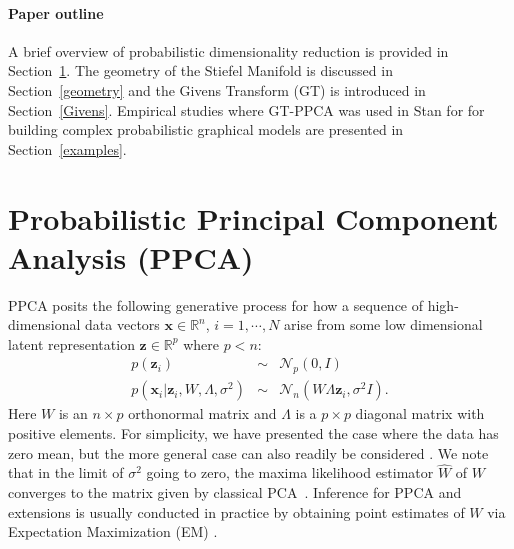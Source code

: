 \documentclass{article}
\newcommand{\mb}[1]{\mathbf{#1}}
\begin{document}
\paragraph{Paper outline} A brief overview of probabilistic dimensionality reduction is provided in Section~\ref{Probabilistic dimensionality reduction}. The geometry of the Stiefel Manifold is discussed in Section~\ref{geometry} and the Givens Transform (GT) is introduced in Section~\ref{Givens}. Empirical studies where GT-PPCA was used in Stan for for building complex probabilistic graphical models are presented in Section~\ref{examples}.


\section{Probabilistic Principal Component Analysis (PPCA)} \label{Probabilistic dimensionality reduction}

PPCA posits the following generative process for how a sequence of high-dimensional data vectors $\mathbf{x} \in \mathbb{R}^n$, $i = 1, \cdots, N$ arise from some low dimensional latent representation $\mathbf{z} \in \mathbb{R}^p$ where $p < n$:
\begin{eqnarray}
\label{eq:PpcaGenerativeProcess}
p(\mb{z}_i) &\sim& \mathcal{N}_p(0, I) \nonumber\\
p(\mb{x}_i | \mb{z}_i, W, \Lambda, \sigma^2) &\sim& \mathcal{N}_n(W \Lambda \mb{z}_i, \sigma^2 I).
\end{eqnarray}
Here $W$ is an $n \times p$ orthonormal matrix and $\Lambda$ is a $p \times p$ diagonal matrix with positive elements.  For simplicity, we have presented the case where the data has zero mean, but the more general case can also readily be considered \citep[chapt.~12.1]{murphy2012machine}. We note that in the limit of $\sigma^2$ going to zero, the maxima likelihood estimator $\hat{W}$ of $W$ converges to the matrix given by classical PCA~\citep{tipping1999probabilistic}. Inference for PPCA and extensions is usually conducted in practice by obtaining point estimates of $W$ via Expectation Maximization (EM) \citep[chapt.~12.2.5]{murphy2012machine}.
\end{document}
